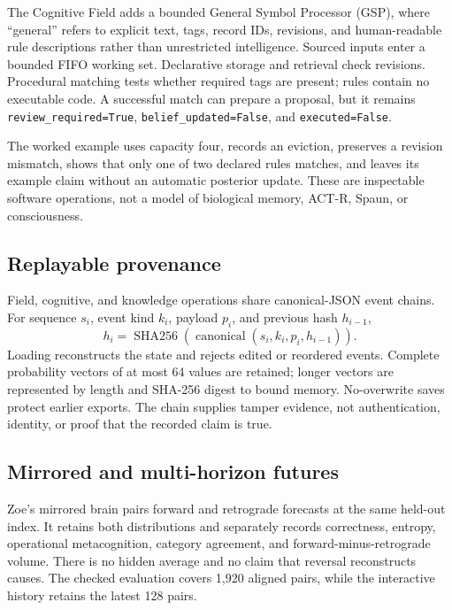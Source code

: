 \documentclass[11pt,a4paper]{article}
\begin{document}
The Cognitive Field adds a bounded General Symbol Processor (GSP), where ``general'' refers to explicit text, tags, record IDs, revisions, and human-readable rule descriptions rather than unrestricted intelligence. Sourced inputs enter a bounded FIFO working set. Declarative storage and retrieval check revisions. Procedural matching tests whether required tags are present; rules contain no executable code. A successful match can prepare a proposal, but it remains \texttt{review\_required=True}, \texttt{belief\_updated=False}, and \texttt{executed=False}.

The worked example uses capacity four, records an eviction, preserves a revision mismatch, shows that only one of two declared rules matches, and leaves its example claim without an automatic posterior update. These are inspectable software operations, not a model of biological memory, ACT-R, Spaun, or consciousness.

\subsection{Replayable provenance}
Field, cognitive, and knowledge operations share canonical-JSON event chains. For sequence $s_i$, event kind $k_i$, payload $p_i$, and previous hash $h_{i-1}$,
\begin{equation}
h_i=\operatorname{SHA256}\!\left(\operatorname{canonical}(s_i,k_i,p_i,h_{i-1})\right).
\label{eq:zoe-significance-chain}
\end{equation}
Loading reconstructs the state and rejects edited or reordered events. Complete probability vectors of at most 64 values are retained; longer vectors are represented by length and SHA-256 digest to bound memory. No-overwrite saves protect earlier exports. The chain supplies tamper evidence, not authentication, identity, or proof that the recorded claim is true.

\subsection{Mirrored and multi-horizon futures}
Zoe's mirrored brain pairs forward and retrograde forecasts at the same held-out index. It retains both distributions and separately records correctness, entropy, operational metacognition, category agreement, and forward-minus-retrograde volume. There is no hidden average and no claim that reversal reconstructs causes. The checked evaluation covers 1,920 aligned pairs, while the interactive history retains the latest 128 pairs.
\end{document}
